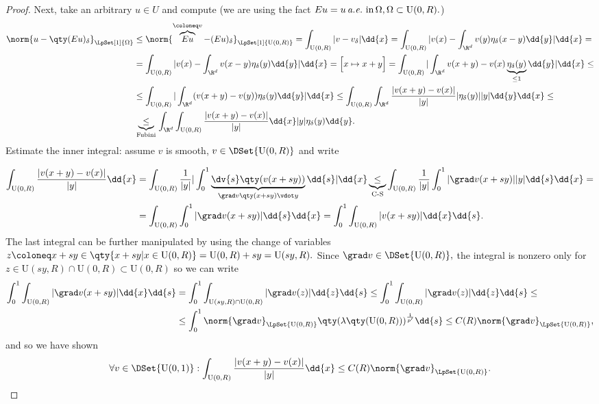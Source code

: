 \begin{proof}
	Next, take an arbitrary $u \in U$ and compute (we are using the fact $Eu = u \, \text{\textit{a.e.}} \, \, \text{in} \, \Omega, \Omega \subset \text{U}(0,R).$)
	\begin{align*}
		\norm{u-\qty(Eu)_{\delta}}_{\LpSet[1]{\Omega}} &\leq \norm{\overbrace{Eu}^{\coloneq v}-(Eu)_{\delta}}_{\LpSet[1]{\text{U}(0,R)}} = \int_{\text{U}(0,R)}|v-v_{\delta}|\dd{x} = \int_{\text{U}(0,R)}|v(x) - \int_{\R^d}v(y) \eta_{\delta}(x-y)\dd{y}|\dd{x}= \\
							       &=\int_{\text{U}(0,R)}|v(x) - \int_{\R^{d}}v(x-y)\eta_{\delta}(y)\dd{y}|\dd{x} = \Big[ x \mapsto x +y \Big] = \int_{\text{U}(0,R)}|\int_{\R^{d}}v(x+y) - v(x) \underbrace{\eta_{\delta}(y)}_{\leq 1}\dd{y}|\dd{x} \leq \\
							       &\leq \int_{\text{U}(0,R)}|\int_{\R^{d}}(v(x+y) - v(y))\eta_{\delta}(y)\dd{y}|\dd{x}\leq \int_{\text{U}(0,R)}\int_{\R^d}\frac{|v(x+y)-v(x)|}{|y|}|\eta_{\delta}(y)| |y| \dd{y}\dd{x}\leq \\
									& \underbrace{\leq}_{\, \text{Fubini} \,} \int_{\R^d}\int_{\text{U}(0,R)}\frac{|v(x+y)-v(x)|}{|y|}\dd{x}|y| \eta_{\delta}(y)\dd{y}.
	\end{align*}
	Estimate the inner integral: assume $v$ is smooth, $v \in \DSet{\text{U}(0,R)}$ and write

	\begin{align*}
		\int_{\text{U}(0,R)}\frac{|v(x+y) - v(x)|}{|y|}\dd{x} &= \int_{\text{U}(0,R)}\frac{1}{|y|}|\int_{0}^1 \underbrace{\dv{s} \qty(v(x+sy))}_{\grad v\qty(x+sy) \vdot y}\dd{s}|\dd{x} \underbrace{\leq}_{\, \text{C-S} \,} \int_{\text{U}(0,R)}\frac{1}{|y|}\int_{0}^1 |\grad v (x+sy)||y|\dd{s}\dd{x} =\\
								      &= \int_{\text{U}(0,R)}\int_0^1 |\grad v(x+sy)|\dd{s}\dd{x} = \int_{0}^1 \int_{\text{U}(0,R)}|v(x+sy)|\dd{x}\dd{s}. 
	\end{align*}
	The last integral can be further manipulated by using the change of variables $z \coloneq x + sy \in \qty{x + sy | x \in \text{U}(0,R)} = \text{U}(0,R) + sy = \text{U}(sy,R).$ Since $\grad v \in \DSet{\text{U}(0,R)},$ the integral is nonzero only for $z \in \text{U}(sy,R) \cap \text{U}(0,R) \subset \text{U}(0,R)$ so we can write
	\begin{align*}
		\int_0^1 \int_{\text{U}(0,R)}|\grad v(x+sy)|\dd{x}\dd{s} &= \int_0^1 \int_{\text{U}(sy,R) \cap \text{U}(0,R)}|\grad v(z)|\dd{z}\dd{s} \leq \int_0^1 \int_{\text{U}(0,R)}|\grad v(z)|\dd{z}\dd{s}\leq \\
									 &\leq \int_0^1 \norm{\grad v}_{\LpSet{\text{U}(0,R)}}\qty(\lambda\qty(\text{U}(0,R)))^{\frac{1}{p'}}\dd{s} \leq C(R) \norm{\grad v}_{\LpSet{\text{U}(0,R)}},
	\end{align*}
	and so we have shown
	\[
		\forall v \in \DSet{\text{U}(0,1)}: \int_{\text{U}(0,R)}\frac{|v(x+y)-v(x)|}{|y|}\dd{x} \leq C(R) \norm{\grad v}_{\LpSet{\text{U}(0,R)}}.
	\]
	

\end{proof}
